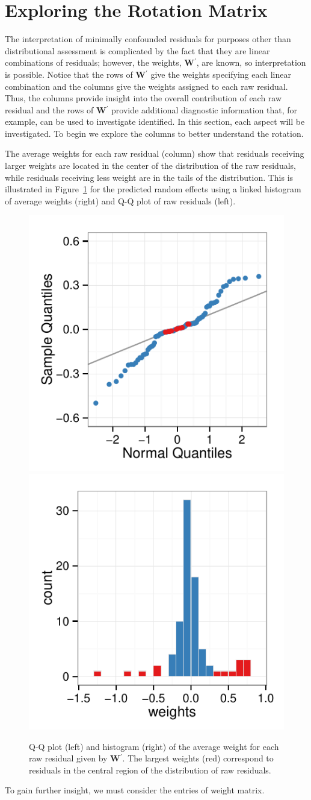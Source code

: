 \documentclass{article} %
\newcommand{\trans}{\ensuremath{^\prime}}
\begin{document}
\section{Exploring the Rotation Matrix}

The interpretation of minimally confounded residuals for purposes other than distributional assessment is complicated by the fact that they are linear combinations of residuals; however, the weights, $\bm{W}\trans$, are known, so interpretation is possible. Notice that the rows of $\bm{W}\trans$ give the weights specifying each linear combination and the columns give the weights assigned to each raw residual. Thus, the columns provide insight into the overall contribution of each raw residual and the rows of $\bm{W}\trans$ provide additional diagnostic information that, for example, can be used to investigate identified. In this section, each aspect will be investigated. To begin we explore the columns to better understand the rotation.

The average weights for each raw residual (column) show that residuals receiving larger weights are located in the center of the distribution of the raw residuals, while residuals receiving less weight are in the tails of the distribution. This is illustrated in Figure~\ref{fig:tailwts} for the predicted random effects using a linked histogram of average weights (right) and Q-Q plot of raw residuals (left).
%
\begin{figure}[htbp]
	\centering
	\includegraphics[width=0.4\linewidth]{qq-wts-tail.pdf}
	\includegraphics[width=0.4\linewidth]{hist-wts-tail.pdf}
	\caption{\label{fig:tailwts} Q-Q plot (left) and histogram (right) of the average weight for each raw residual given by $\bm{W}\trans$. The largest weights (red) correspond to residuals in the central region of the distribution of raw residuals.}
\end{figure}
%
To gain further insight, we must consider the entries of weight matrix.
\end{document}
